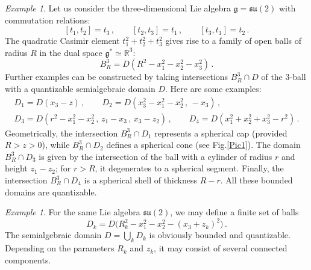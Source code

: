 \documentclass[12pt,a4paper]{article}
\numberwithin{equation}{section}
\theoremstyle{theorem}
\theoremstyle{remark}
\newtheorem{example}[equation]{Example}
\newcommand{\gs}{\mathfrak{g}^\ast}
\begin{document}
\begin{example}Let us consider the three-dimensional Lie algebra $\mathfrak{g}=\mathfrak{su}(2)$ with commutation relations:
$$
[t_1,t_2]=t_3\,,\qquad[t_2,t_3]=t_1\,,\qquad[t_3,t_1]=t_2\,.
$$
The quadratic Casimir element $t_1^2+t_2^2+t_3^2$ gives rise to a family of open balls of radius $R$ in the dual space $\gs\simeq \mathbb{R}^3$:
$$
B^3_R=D(R^2-x_1^2-x_2^2-x_3^2)\,.
$$
Further examples can be constructed by taking  intersections $B^3_R\cap D$ of the $3$-ball  with a quantizable semialgebraic domain $D$. 
Here are some examples:
\begin{equation}
\begin{array}{c}
    D_1=D(x_3-z)\,,\qquad D_2=D(x_3^2-x_1^2-x_2^2\,,\,-x_3)\,,\\[3mm]
    D_3=D(r^2-x_1^2-x_2^2\,, \,z_1-x_3\,,\,x_3-z_2)\,, \qquad D_4=D(x_1^2+x_2^2+x_3^2-r^2)\,.
    \end{array}
\end{equation}
Geometrically,  the intersection $B^3_R\cap D_1$ represents a spherical cap (provided $R>z>0$), while $B^3_R\cap D_2$ defines a spherical cone (see Fig.\ref{Pic1}). The domain $B^3_R\cap D_3$ is given by the intersection of the ball with a cylinder of radius $r$ and height $z_1-z_2$; for $r>R$, it degenerates to a spherical segment.  Finally, the intersection $B_R^3\cap D_4$ is a spherical shell of thickness $R-r$.    All these bounded domains are quantizable.
\end{example}
\begin{example}
    For the same Lie algebra $\mathfrak{su}(2)$, we may define a finite set of balls 
    $$
    D_k=D\big(R^2_k-x_1^2-x_2^2-(x_3+z_k)^2\big)\,.
    $$
The semialgebraic domain $D=\bigcup_kD_k$ is obviously bounded and quantizable. Depending on the parameters $R_k$ and $z_k$, it may consist of several connected components.    
    
\end{example}
\end{document}
